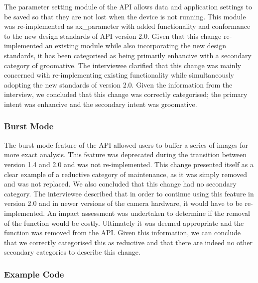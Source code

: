 \documentclass{sig-alternate}
\begin{document}
The parameter setting module of the API allows data and application settings to be saved so that they are not lost when the device is not running. This module was re-implemented as ax\_parameter with added functionality and conformance to the new design standards of API version 2.0.
Given that this change re-implemented an existing module while also incorporating the new design standards, it has been categorised as being primarily enhancive with a secondary category of groomative.
The interviewee clarified that this change was mainly concerned with re-implementing existing functionality while simultaneously adopting the new standards of version 2.0. 
Given the information from the interview, we concluded that this change was correctly categorised; the primary intent was enhancive and the secondary intent was groomative.


\subsubsection{Burst Mode}

The burst mode feature of the API allowed users to buffer a series of images for more exact analysis. This feature was deprecated during the transition between version 1.4 and 2.0 and was not re-implemented.
This change presented itself as a clear example of a reductive category of maintenance, as it was simply removed and was not replaced. We also concluded that this change had no secondary category.
The interviewee described that in order to continue using this feature in version 2.0 and in newer versions of the camera hardware, it would have to be re-implemented. An impact assessment was undertaken to determine if the removal of the function would be costly. Ultimately it was deemed appropriate and the function was removed from the API.
Given this information, we can conclude that we correctly categorised this as reductive and that there are indeed no other secondary categories to describe this change.


\subsubsection{Example Code}
\end{document}
